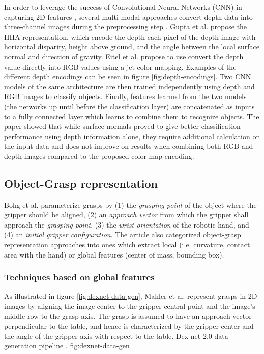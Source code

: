 In order to leverage the success of Convolutional Neural Networks (CNN) in capturing 2D features \cite{Gu2018}, several
multi-modal approaches convert depth data into three-channel images during the preprocessing step
\cite{Eitel2015,Gupta2014RGBDFeatures}. Gupta et al. \cite{Gupta2014RGBDFeatures} propose the HHA representation, which
encode the depth each pixel of the depth image with horizontal disparity, height above ground, and the angle between the
local surface normal and direction of gravity. Eitel et al. \cite{Eitel2015} propose to use convert the depth value
directly into RGB values using a jet color mapping. Examples of the different depth encodings can be seen in figure
\ref{fig:depth-encodings}. Two CNN models of the same architecture are then trained independently using depth and RGB
images to classify objects. Finally, features learned from the two models (the networks up until before the
classification layer) are concatenated as inputs to a fully connected layer which learns to combine them to recognize
objects. The paper showed that while surface normals proved to give better classification performance using depth
information alone, they require additional calculation on the input data and does not improve on results when combining
both RGB and depth images compared to the proposed color map encoding.

\subsection{Object-Grasp representation}
Bohg et al. \cite{Bohg2014} parameterize grasps by (1) the \emph{grasping point} of the object where the gripper
should be aligned, (2) an \emph{approach vector} from which the gripper shall approach the \emph{grasping point},
(3) the \emph{wrist orientation} of the robotic hand, and (4) an \emph{initial gripper configuration}.
The article also categorized object-grasp representation approaches into ones which extract local (i.e. curvature,
contact area with the hand) or global features (center of mass, bounding box).

\subsubsection*{Techniques based on global features}
As illustrated in figure \ref{fig:dexnet-data-gen}, Mahler et al. \cite{mahler2017} represent grasps in 2D images by
aligning the image center to the gripper central point and the image's middle row to the grasp axis. The grasp is
assumed to have an approach vector perpendicular to the table, and hence is characterized by the gripper center and the
angle of the gripper axis with respect to the table.
             {Dex-net 2.0 data generation pipeline \cite{mahler2017}.}
             {fig:dexnet-data-gen}{\textwidth}

